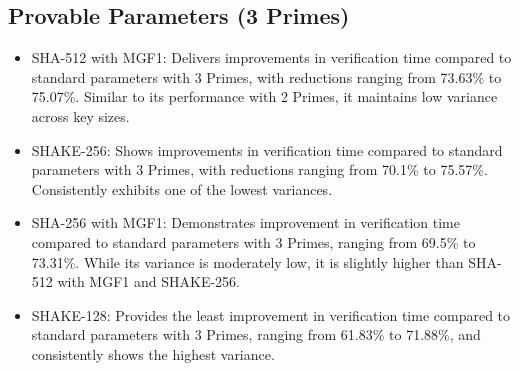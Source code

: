 \documentclass[]{final_report}
\theoremstyle{definition}
\begin{document}
\subsection*{Provable Parameters (3 Primes)}
\begin{itemize}
\item SHA-512 with MGF1: Delivers improvements in verification time compared to standard parameters with 3 Primes, with reductions ranging from 73.63\% to 75.07\%. Similar to its performance with 2 Primes, it maintains low variance across key sizes.
\item SHAKE-256: Shows improvements in verification time compared to standard parameters with 3 Primes, with reductions ranging from 70.1\% to 75.57\%. Consistently exhibits one of the lowest variances.
\item SHA-256 with MGF1: Demonstrates improvement in verification time compared to standard parameters with 3 Primes, ranging from 69.5\% to 73.31\%. While its variance is moderately low, it is slightly higher than SHA-512 with MGF1 and SHAKE-256.
\item SHAKE-128: Provides the least improvement in verification time compared to standard parameters with 3 Primes, ranging from 61.83\% to 71.88\%, and consistently shows the highest variance.
\end{itemize}

\end{document}
